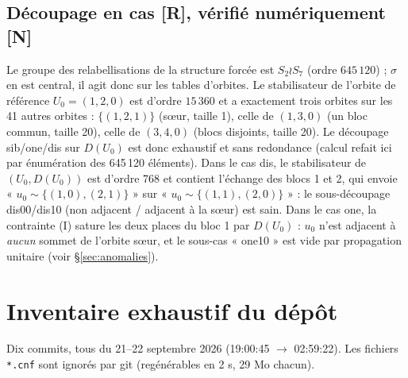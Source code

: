 \documentclass[11pt,a4paper]{article}
\theoremstyle{definition}
\theoremstyle{remark}
\newcommand{\st}[1]{\textbf{[#1]}}
\newcommand{\code}[1]{\texttt{#1}}
\begin{document}
\subsection{Découpage en cas \st{R}, vérifié numériquement \st{N}}
Le groupe des relabellisations de la structure forcée est $S_2\wr S_7$ (ordre $645\,120$) ; $\sigma$ en est central, il agit donc sur les tables d'orbites.
Le stabilisateur de l'orbite de référence $U_0=(1,2,0)$ est d'ordre $15\,360$ et a exactement trois orbites sur les 41 autres orbites : $\{(1,2,1)\}$ (sœur, taille 1), celle de $(1,3,0)$ (un bloc commun, taille 20), celle de $(3,4,0)$ (blocs disjoints, taille 20). Le découpage sib/one/dis sur $D(U_0)$ est donc exhaustif et sans redondance (calcul refait ici par énumération des 645\,120 éléments).
Dans le cas dis, le stabilisateur de $(U_0,D(U_0))$ est d'ordre 768 et contient l'échange des blocs 1 et 2, qui envoie « $u_0\sim\{(1,0),(2,1)\}$ » sur « $u_0\sim\{(1,1),(2,0)\}$ » : le sous-découpage dis00/dis10 (non adjacent / adjacent à la sœur) est sain. Dans le cas one, la contrainte (I) sature les deux places du bloc 1 par $D(U_0)$ : $u_0$ n'est adjacent à \emph{aucun} sommet de l'orbite sœur, et le sous-cas « one10 » est vide par propagation unitaire (voir §\ref{sec:anomalies}).

\section{Inventaire exhaustif du dépôt}\label{sec:inventaire}
Dix commits, tous du 21--22 septembre 2026 (19:00:45 $\to$ 02:59:22). Les fichiers \code{*.cnf} sont ignorés par git (regénérables en 2 s, 29 Mo chacun).
\end{document}
